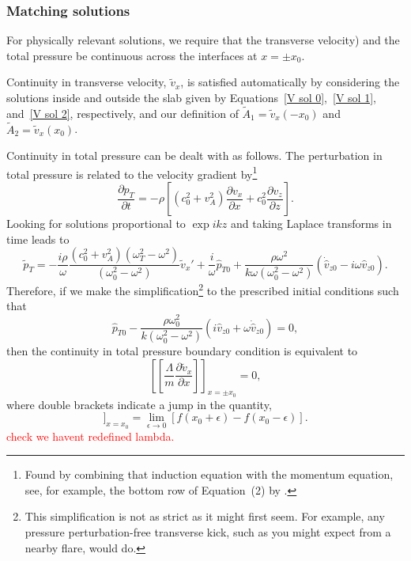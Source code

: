 \documentclass[12pt, draft]{../style-files/ociamthesis}
\begin{document}
\subsubsection{Matching solutions}

For physically relevant solutions, we require that the transverse velocity) and the total pressure be continuous across the interfaces at $x = \pm x_0$.

Continuity in transverse velocity, $\tilde{v}_x$, is satisfied automatically by considering the solutions inside and outside the slab given by Equations~\eqref{V sol 0},~\eqref{V sol 1}, and~\eqref{V sol 2}, respectively, and our definition of $\tilde{A}_1 = \tilde{v}_x(-x_0)$ and $\tilde{A}_2 = \tilde{v}_x(x_0)$.

Continuity in total pressure can be dealt with as follows. The perturbation in total pressure is related to the velocity gradient by\footnote{Found by combining that induction equation with the momentum equation, see, for example, the bottom row of Equation~(2) by \cite{and_etal07}.}
\begin{equation}
\frac{\partial p_T}{\partial t} = -\rho\left[ \left(c_0^2 + v_A^2\right) \frac{\partial v_x}{\partial x} + c_0^2\frac{\partial v_z}{\partial z} \right].
\end{equation}
Looking for solutions proportional to $\exp{ikz}$ and taking Laplace transforms in time leads to
\begin{equation}
\tilde{p}_T = -\frac{i\rho}{\omega} \frac{(c_0^2 + v_A^2)(\omega_T^2 - \omega^2)}{(\omega_0^2 - \omega^2)} \tilde{v}_x' + \frac{i}{\omega} \hat{p}_{T0} + \frac{\rho \omega^2}{k\omega(\omega_0^2 - \omega^2)} \left(\dot{\hat{v}}_{z0} - i\omega\hat{v}_{z0}\right).
\end{equation}
Therefore, if we make the simplification\footnote{This simplification is not as strict as it might first seem. For example, any pressure perturbation-free transverse kick, such as you might expect from a nearby flare, would do.} to the prescribed initial conditions such that
\begin{equation}
\hat{p}_{T0} - \frac{\rho \omega_0^2}{k(\omega_0^2 - \omega^2)} \left(i\hat{v}_{z0} + \omega\dot{\hat{v}}_{z0}\right) = 0,
\end{equation}
then the continuity in total pressure boundary condition is equivalent to
\begin{equation}
\left[ \left[ \frac{\Lambda}{m} \frac{\partial \tilde{v}_x}{\partial x} \right] \right]_{x=\pm x_0} = 0,
\end{equation}
where double brackets indicate a jump in the quantity,
\begin{equation}
[[f]]_{x=x_0} = \lim_{\epsilon \to 0} [f(x_0 + \epsilon) - f(x_0 - \epsilon)].
\end{equation}
\textcolor{red}{check we havent redefined lambda.}
\end{document}
